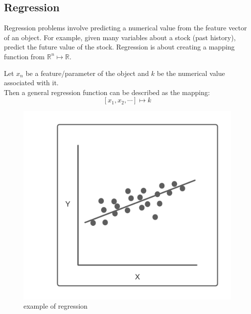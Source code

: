\documentclass[10pt,a4paper]{report}
\begin{document}
			\subsection{Regression}
				Regression problems involve predicting a numerical value from the feature vector of an object.
				For example, given many variables about a stock (past history), predict the future value of the stock. Regression is
				about creating a mapping function from $\mathbb{R}^n \mapsto \mathbb{R}$. \par
				Let $x_n$ be a feature/parameter of the object and $k$ be the numerical value associated with it.\\
				Then a general regression function can be described as the mapping: \[[x_1,x_2,\cdots] \mapsto k\]
				\begin{figure}[h]
					\centering
					\includegraphics[scale=0.7]{regression-diagram.png}
					\caption{example of regression}
					\label{fig:regression}
				\end{figure}
\end{document}
